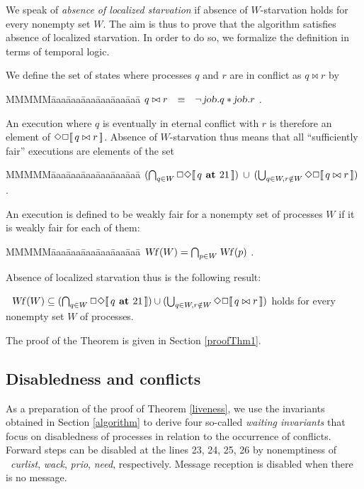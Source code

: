 \documentclass[10pt]{article} \usepackage[english]{babel}
\newenvironment{tab}{\begin{tabbing}
MMMMM\=aaa\=aaa\=aaa\=aaa\=aaa\=aaa\= \kill}{\end{tabbing}}
\def\sem #1{\hbox{$[\![\, #1\, ]\!] $}}
\def\S #1/{\mbox {\textsl{#1}}}
\def\B #1/{\mbox {\textbf{#1}}}
\def\EQ     {\mbox{\quad$\equiv$\quad}}
\begin{document}
We speak of \emph{absence of localized starvation} if absence of
$W$-starvation holds for every nonempty set $W$.  The aim is thus to
prove that the algorithm satisfies absence of localized starvation. In
order to do so, we formalize the definition in terms of temporal
logic.

We define the set of states where
processes $q$ and $r$ are in conflict as $q\bowtie r$ by
\begin{tab}
\> $ q\bowtie r \EQ \neg\,\S job/.q * \S job/.r$ .
\end{tab}
An execution where $q$ is eventually in eternal conflict with $r$ is
therefore an element of $\Diamond \Box\sem{q \bowtie r}$.  Absence of
$W$-starvation thus means that all ``sufficiently fair'' executions
are elements of the set
\begin{tab}
  \> $ (\bigcap_{q\in W} \Box\Diamond\sem{q\B\ at /21})\: \cup\:
  (\bigcup_{q\in W, r\notin W} \Diamond \Box\sem{q \bowtie r})$ .
\end{tab}

An execution is defined to be weakly fair for a nonempty set of
processes $W$ if it is weakly fair for each of them:
\begin{tab}
  \> $ \S Wf/(W) = \bigcap_{p\in W} \S Wf/(p) $ . 
\end{tab}
Absence of localized starvation thus is the following result:

\begin{theorem} \label{liveness} \ $\S Wf/(W) \subseteq (\bigcap_{q\in
    W} \Box\Diamond\sem{q\B\ at /21}) \cup (\bigcup_{q\in W, r\notin
    W} \Diamond \Box\sem{q \bowtie r})$ holds for every nonempty set
  $W$ of processes.
\end{theorem}

The proof of the Theorem is given in Section \ref{proofThm1}.

\subsection {Disabledness and conflicts} 
\label{conflicts}

As a preparation of the proof of Theorem \ref{liveness}, we use the
invariants obtained in Section \ref{algorithm} to derive four
so-called \emph{waiting invariants} that focus on disabledness of
processes in relation to the occurrence of conflicts.  Forward steps
can be disabled at the lines 23, 24, 25, 26 by nonemptiness of \S
curlist/, \S wack/, \S prio/, \S need/, respectively.  Message
reception is disabled when there is no message.
\end{document}
